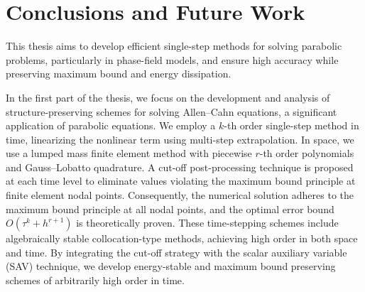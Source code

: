 \documentclass[a4paper, oneside]{book}
\def\epsilon{\varepsilon}
\begin{document}




\chapter{Conclusions and Future Work}

This thesis aims to develop efficient single-step methods for solving parabolic problems, particularly in phase-field models, and ensure high accuracy while preserving maximum bound and energy dissipation. 

In the first part of the thesis, we focus on the development and analysis of structure-preserving schemes for solving Allen–Cahn equations, a significant application of parabolic equations. We employ a $k$-th order single-step method in time, linearizing the nonlinear term using multi-step extrapolation. In space, we use a lumped mass finite element method with piecewise $r$-th order polynomials and Gauss–Lobatto quadrature. A cut-off post-processing technique is proposed at each time level to eliminate values violating the maximum bound principle at finite element nodal points. Consequently, the numerical solution adheres to the maximum bound principle at all nodal points, and the optimal error bound $O(\tau^k+h^{r+1})$ is theoretically proven. These time-stepping schemes include algebraically stable collocation-type methods, achieving high order in both space and time. By integrating the cut-off strategy with the scalar auxiliary variable (SAV) technique, we develop energy-stable and maximum bound preserving schemes of arbitrarily high order in time.
\end{document}
